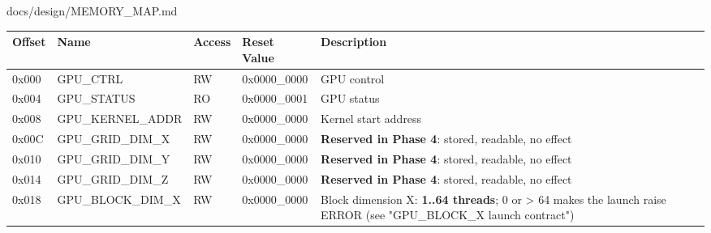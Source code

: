 \begin{relocated}{docs/design/MEMORY_MAP.md}
{{
\begin{longtable}[]{@{}
  >{\centering\arraybackslash}p{}
  >{\centering\arraybackslash}p{}
  >{\centering\arraybackslash}p{}
  >{\centering\arraybackslash}p{}
  >{\centering\arraybackslash}p{}@{}}
\toprule\noalign{}
\begin{minipage}[b]{\linewidth}\centering
Offset
\end{minipage} & \begin{minipage}[b]{\linewidth}\centering
Name
\end{minipage} & \begin{minipage}[b]{\linewidth}\centering
Access
\end{minipage} & \begin{minipage}[b]{\linewidth}\centering
Reset Value
\end{minipage} & \begin{minipage}[b]{\linewidth}\centering
Description
\end{minipage} \\
\midrule\noalign{}
\endhead
\bottomrule\noalign{}
\endlastfoot
0x000 & GPU\_CTRL & RW & 0x0000\_\allowbreak{}0000 & GPU control \\
0x004 & GPU\_\allowbreak{}STATUS & RO & 0x0000\_\allowbreak{}0001 & GPU
status \\
0x008 & GPU\_\allowbreak{}KERNEL\_\allowbreak{}ADDR & RW &
0x0000\_\allowbreak{}0000 & Kernel start address \\
0x00C & GPU\_\allowbreak{}GRID\_\allowbreak{}DIM\_\allowbreak{}X & RW &
0x0000\_\allowbreak{}0000 & \textbf{Reserved in Phase 4}: stored,
readable, no effect \\
0x010 & GPU\_\allowbreak{}GRID\_\allowbreak{}DIM\_\allowbreak{}Y & RW &
0x0000\_\allowbreak{}0000 & \textbf{Reserved in Phase 4}: stored,
readable, no effect \\
0x014 & GPU\_\allowbreak{}GRID\_\allowbreak{}DIM\_\allowbreak{}Z & RW &
0x0000\_\allowbreak{}0000 & \textbf{Reserved in Phase 4}: stored,
readable, no effect \\
0x018 & GPU\_\allowbreak{}BLOCK\_\allowbreak{}DIM\_\allowbreak{}X & RW &
0x0000\_\allowbreak{}0000 & Block dimension X: \textbf{1..64 threads}; 0
or \textgreater{} 64 makes the launch raise ERROR (see
"GPU\_\allowbreak{}BLOCK\_\allowbreak{}X launch contract") \\

\end{longtable}}}
\end{relocated}
